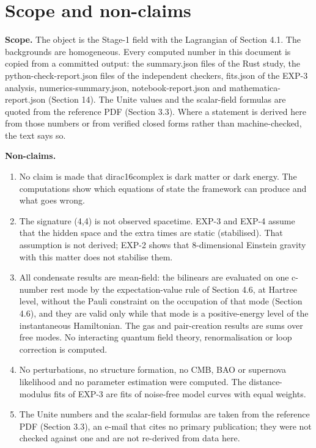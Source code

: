 \documentclass[11pt]{article}
\begin{document}
\section{Scope and non-claims}

\textbf{Scope.} The object is the Stage-1 field with the Lagrangian of Section 4.1. The backgrounds are homogeneous. Every computed number in this document is copied from a committed output: the summary.json files of the Rust study, the python-check-report.json files of the independent checkers, fits.json of the EXP-3 analysis, numerics-summary.json, notebook-report.json and mathematica-report.json (Section 14). The Unite values and the scalar-field formulas are quoted from the reference PDF (Section 3.3). Where a statement is derived here from those numbers or from verified closed forms rather than machine-checked, the text says so.

\textbf{Non-claims.}

\begin{enumerate}
\item No claim is made that dirac16complex is dark matter or dark energy. The computations show which equations of state the framework can produce and what goes wrong.
\item The signature (4,4) is not observed spacetime. EXP-3 and EXP-4 assume that the hidden space and the extra times are static (stabilised). That assumption is not derived; EXP-2 shows that 8-dimensional Einstein gravity with this matter does not stabilise them.
\item All condensate results are mean-field: the bilinears are evaluated on one c-number rest mode by the expectation-value rule of Section 4.6, at Hartree level, without the Pauli constraint on the occupation of that mode (Section 4.6), and they are valid only while that mode is a positive-energy level of the instantaneous Hamiltonian. The gas and pair-creation results are sums over free modes. No interacting quantum field theory, renormalisation or loop correction is computed.
\item No perturbations, no structure formation, no CMB, BAO or supernova likelihood and no parameter estimation were computed. The distance-modulus fits of EXP-3 are fits of noise-free model curves with equal weights.
\item The Unite numbers and the scalar-field formulas are taken from the reference PDF (Section 3.3), an e-mail that cites no primary publication; they were not checked against one and are not re-derived from data here.
\end{enumerate}
\end{document}
